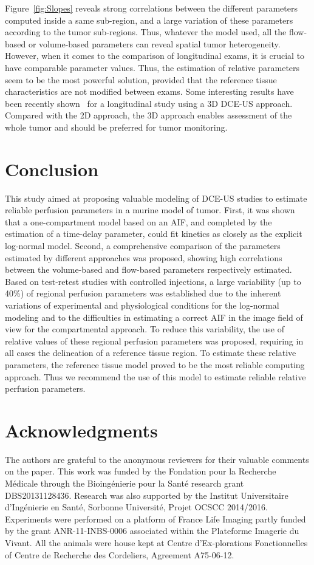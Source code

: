  Figure~\ref{fig:Slopes} reveals strong correlations between the different parameters computed inside a same sub-region, and a large variation of these parameters according to the tumor sub-regions. Thus, whatever the model used,  all the flow-based or volume-based parameters can reveal spatial tumor heterogeneity. However, when it comes to the comparison of longitudinal exams, it is crucial to have comparable parameter values. Thus, the estimation of relative parameters seem to be the most powerful solution, provided that the reference tissue characteristics are not modified between exams.
Some interesting results have been recently shown~\cite{Wang2015bb} for a longitudinal study using a 3D DCE-US approach. Compared with the 2D approach, the 3D approach enables assessment of the whole tumor and should be preferred for tumor monitoring.

 \section{Conclusion}
This study aimed at proposing valuable modeling of DCE-US studies to estimate reliable perfusion parameters in a murine model of tumor. First, it was shown that a one-compartment model based on an AIF, and completed by the estimation of a time-delay parameter, could fit kinetics as closely as the explicit log-normal model. Second, a comprehensive comparison of the parameters estimated by different approaches was proposed, showing high correlations between the volume-based  and flow-based parameters respectively estimated. Based on test-retest studies with controlled injections, a large variability (up to 40\%) of regional perfusion parameters was established due to the inherent variations of experimental and physiological conditions for the log-normal modeling and to the difficulties in estimating a correct AIF in the image field of view for the compartmental approach. To reduce this variability, the use of relative values of these regional perfusion parameters was proposed, requiring in all cases the delineation of a reference tissue region. To estimate these relative parameters, the reference tissue model proved to be the most reliable computing approach. Thus we recommend the use of this model to estimate reliable relative perfusion parameters.

\section{Acknowledgments}
The authors are grateful to the anonymous reviewers for their valuable comments on the paper.
This work was funded by the Fondation pour la Recherche M\'edicale through the Bioing\'enierie pour la Sant\'e research grant DBS20131128436. Research was also supported by the Institut Universitaire d{'}Ing\'enierie en Sant\'e, Sorbonne Universit\'e, Projet OCSCC 2014/2016.
Experiments were performed on a platform of France Life Imaging partly funded by the grant ANR-11-INBS-0006 associated within the Plateforme Imagerie du Vivant. All the animals were house kept at Centre d{'}Ex-plorations Fonctionnelles of Centre de Recherche des Cordeliers, Agreement A75-06-12.

